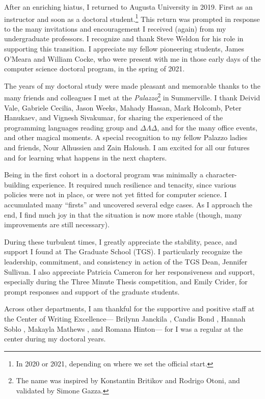 After an enriching hiatus, I returned to Augusta University in 2019.
First as an instructor and soon as a doctoral student.\footnote{In 2020 or 2021, depending on where we set the official start.}
This return was prompted in response to the many invitations and encouragement I received (again) from my undergraduate professors.
I recognize and thank Steve Weldon for his role in supporting this transition.
I appreciate my fellow pioneering students, James O'Meara and William Cocke, who were present with me in those early days of the computer science doctoral program, in the spring of 2021.

The years of my doctoral study were made pleasant and memorable thanks to the many friends and colleagues I met at the \emph{Palazzo}\footnote{The name was inspired by Konstantin Britikov and Rodrigo Otoni, and validated by Simone Gazza.} in Summerville.
I thank Deivid Vale, Gabriele Cecilia, Jason Weeks, Mahady Hassan, Mark Holcomb, Peter Hanukaev, and Vignesh Sivakumar, for sharing the experienced of the programming languages reading group and $\Delta\Lambda\Delta$, and for the many office events, and other magical moments.
A special recognition to my fellow Palazzo ladies and friends, Nour Alhussien and Zain Haloush.
I am excited for all our futures and for learning what happens in the next chapters.

Being in the first cohort in a doctoral program was minimally a character-building experience.
It required much resilience and tenacity, since various policies were not in place, or were not yet fitted for computer science.
I accumulated many \enquote{firsts} and uncovered several edge cases.
As I approach the end, I find much joy in that the situation is now more stable (though, many improvements are still necessary).

During these turbulent times, I greatly appreciate the stability, peace, and support I found at The Graduate School (TGS).
I particularly recognize the leadership, commitment, and consistency in action of the TGS Dean, Jennifer Sullivan.
I also appreciate Patricia Cameron for her responsiveness and support, especially during the Three Minute Thesis competition, and
Emily Crider, for prompt responses and support of the graduate students.

Across other departments, I am thankful for the supportive and positive staff at the Center of Writing Excellence---%
Brilynn Janckila%
, Candis Bond%
, Hannah Soblo%
, Makayla Mathews%
, and Romana Hinton---%
for I was a regular at the center during my doctoral years.

